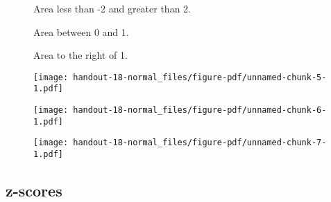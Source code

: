 \documentclass[
  letterpaper,
  DIV=11,
  numbers=noendperiod]{scrartcl}
\begin{document}
\begin{figure}

\begin{minipage}[t]{0.33\linewidth}

{\centering 

Area less than -2 and greater than 2.

}

\end{minipage}%
%
\begin{minipage}[t]{0.33\linewidth}

{\centering 

Area between 0 and 1.

}

\end{minipage}%
%
\begin{minipage}[t]{0.33\linewidth}

{\centering 

Area to the right of 1.

}

\end{minipage}%
\newline
\begin{minipage}[t]{0.33\linewidth}

{\centering 

\texttt{[image: handout-18-normal\_files/figure-pdf/unnamed-chunk-5-1.pdf]}

}

\end{minipage}%
%
\begin{minipage}[t]{0.33\linewidth}

{\centering 

\texttt{[image: handout-18-normal\_files/figure-pdf/unnamed-chunk-6-1.pdf]}

}

\end{minipage}%
%
\begin{minipage}[t]{0.33\linewidth}

{\centering 

\texttt{[image: handout-18-normal\_files/figure-pdf/unnamed-chunk-7-1.pdf]}

}

\end{minipage}%

\end{figure}

\clearpage

\hypertarget{z-scores}{%
\subsection{z-scores}\label{z-scores}}
\end{document}
